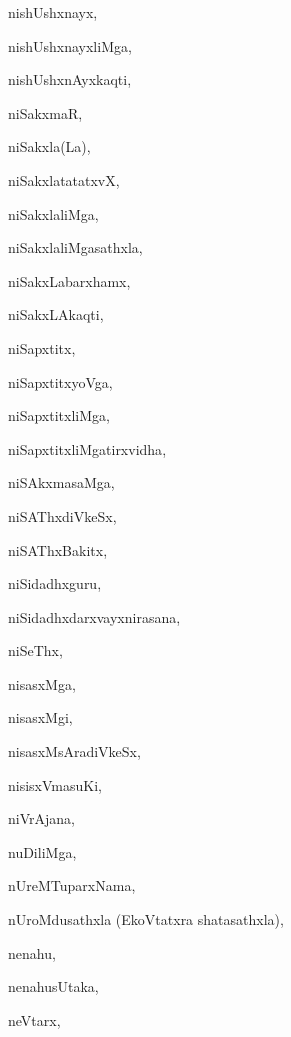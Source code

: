 \begin{multicols}{2}
{nishUshxnayx}, \pageref{nishUshxnayx}

{nishUshxnayxliMga}, \pageref{nishUshxnayxliMga}

{nishUshxnAyxkaqti}, \pageref{nishUshxnAyxkaqti}

{niSakxmaR}, \pageref{niSakxmaR}

{niSakxla(La)}, \pageref{niSakxlaLa}

{niSakxlatatatxvX}, \pageref{niSakxlatatatxvX}

{niSakxlaliMga}, \pageref{niSakxlaliMga}

{niSakxlaliMgasathxla}, \pageref{niSakxlaliMgasathxla}

{niSakxLabarxhamx}, \pageref{niSakxLabarxhamx}

{niSakxLAkaqti}, \pageref{niSakxLAkaqti}

{niSapxtitx}, \pageref{niSapxtitx}

{niSapxtitxyoVga}, \pageref{niSapxtitxyoVga}

{niSapxtitxliMga}, \pageref{niSapxtitxliMga}

{niSapxtitxliMgatirxvidha}, \pageref{niSapxtitxliMgatirxvidha}

{niSAkxmasaMga}, \pageref{niSAkxmasaMga}

{niSAThxdiVkeSx}, \pageref{niSAThxdiVkeSx}

{niSAThxBakitx}, \pageref{niSAThxBakitx}

{niSidadhxguru}, \pageref{niSidadhxguru}

{niSidadhxdarxvayxnirasana}, \pageref{niSidadhxdarxvayxnirasana}

{niSeThx}, \pageref{niSeThx}

{nisasxMga}, \pageref{nisasxMga}

{nisasxMgi}, \pageref{nisasxMgi}

{nisasxMsAradiVkeSx}, \pageref{nisasxMsAradiVkeSx}

{nisisxVmasuKi}, \pageref{nisisxVmasuKi}

{niVrAjana}, \pageref{niVrAjana}

{nuDiliMga}, \pageref{nuDiliMga}

{nUreMTuparxNama}, \pageref{nUreMTuparxNama}

{nUroMdusathxla (EkoVtatxra shatasathxla)}, \pageref{nUroMdusathxlaEkoVtatxra shatasathxla}

{nenahu}, \pageref{nenahu}

{nenahusUtaka}, \pageref{nenahusUtaka}

{neVtarx}, \pageref{neVtarx}


\end{multicols}
